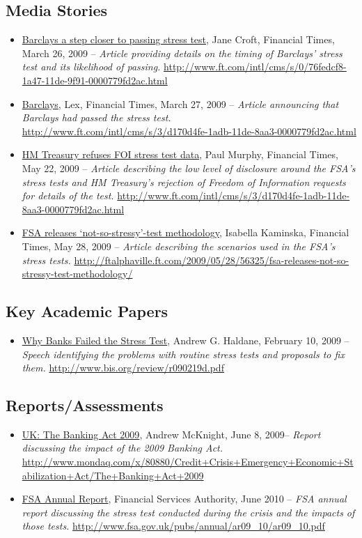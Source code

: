 \documentclass[12pt]{article}
\begin{document}
\subsection{Media Stories}

\begin{itemize}
\item
\ul{Barclays a step closer to passing stress test}, Jane Croft, Financial Times, March 26, 2009 -- \emph{Article providing details on the timing of Barclays' stress test and its likelihood of passing.} \url{http://www.ft.com/intl/cms/s/0/76fedcf8-1a47-11de-9f91-0000779fd2ac.html}
\item
\ul{Barclays}, Lex, Financial Times, March 27, 2009 -- \emph{Article announcing that Barclays had passed the stress test.} \url{http://www.ft.com/intl/cms/s/3/d170d4fe-1adb-11de-8aa3-0000779fd2ac.html}
\item
\ul{HM Treasury refuses FOI stress test data}, Paul Murphy, Financial Times, May 22, 2009 -- \emph{Article describing the low level of disclosure around the FSA's stress tests and HM Treasury's rejection of Freedom of Information requests for details of the test.} \url{http://www.ft.com/intl/cms/s/3/d170d4fe-1adb-11de-8aa3-0000779fd2ac.html}
\item
\ul{FSA releases `not-so-stressy'-test methodology}, Isabella Kaminska, Financial Times, May 28, 2009 -- \emph{Article describing the scenarios used in the FSA's stress tests.} \url{http://ftalphaville.ft.com/2009/05/28/56325/fsa-releases-not-so-stressy-test-methodology/}
\end{itemize}

\subsection{Key Academic Papers}

\begin{itemize}
\item
\ul{Why Banks Failed the Stress Test},
 Andrew G. Haldane, February 10, 2009 -- \emph{Speech identifying the problems with routine stress tests and proposals to fix them.} \url{http://www.bis.org/review/r090219d.pdf}
\end{itemize}

\subsection{Reports/Assessments}

\begin{itemize}
\item
\ul{UK: The Banking Act 2009},
Andrew McKnight, June 8, 2009-- \emph{Report discussing the impact of the 2009 Banking Act.} \url{http://www.mondaq.com/x/80880/Credit+Crisis+Emergency+Economic+Stabilization+Act/The+Banking+Act+2009}
\item
\ul{FSA Annual Report}, Financial Services Authority, June 2010 -- \emph{FSA annual report discussing the stress test conducted during the crisis and the impacts of those tests.} \url{http://www.fsa.gov.uk/pubs/annual/ar09_10/ar09_10.pdf}
\end{itemize}
\end{document}
